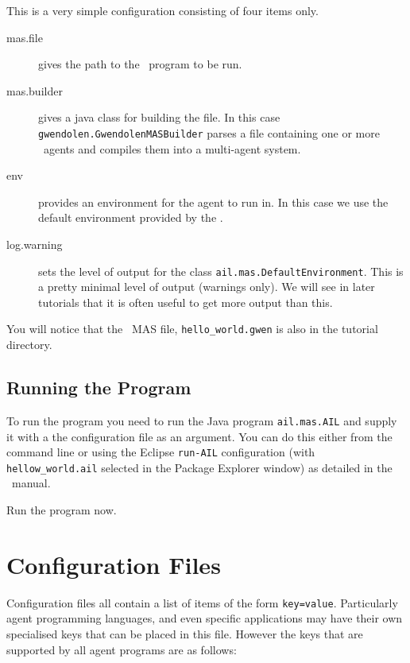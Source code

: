 This is a very simple configuration consisting of four items only.
\begin{description}
\item[mas.file] gives the path to the \gwendolen\ program to be run.
\item[mas.builder] gives a java class for building the file.  In this case \texttt{gwendolen.GwendolenMASBuilder} parses a file containing one or more \gwendolen\ agents and compiles them into a multi-agent system.
\item[env] provides an environment for the agent to run in.  In this case we use the default environment provided by the \ail.
\item[log.warning] sets the level of output for the class \texttt{ail.mas.DefaultEnvironment}.  This is a pretty minimal level of output (warnings only).  We will see in later tutorials that it is often useful to get more output than this.
\end{description}
You will notice that the \gwendolen\ MAS file, \texttt{hello\_world.gwen} is also in the tutorial directory.

\subsection{Running the Program}

To run the program you need to run the Java program \texttt{ail.mas.AIL} and supply it with a the configuration file as an argument.  You can do this either from the command line or using the Eclipse \texttt{run-AIL} configuration (with \texttt{hellow\_world.ail} selected in the Package Explorer window) as detailed in the \mcapl\ manual.

Run the program now.

\section{Configuration Files}

Configuration files all contain a list of items of the form \texttt{key=value}.  Particularly agent programming languages, and even specific applications may have their own specialised keys that can be placed in this file.  However the keys that are supported by all agent programs are as follows:

